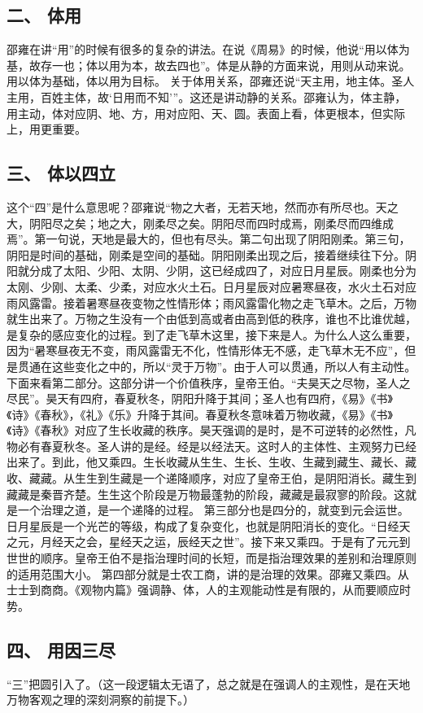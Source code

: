 \documentclass{article}
\begin{document}
\subsection{二、	体用}
邵雍在讲“用”的时候有很多的复杂的讲法。在说《周易》的时候，他说“用以体为基，故存一也；体以用为本，故去四也”。体是从静的方面来说，用则从动来说。用以体为基础，体以用为目标。
关于体用关系，邵雍还说“天主用，地主体。圣人主用，百姓主体，故‘日用而不知’”。这还是讲动静的关系。邵雍认为，体主静，用主动，体对应阴、地、方，用对应阳、天、圆。表面上看，体更根本，但实际上，用更重要。
\subsection{三、	体以四立}
这个“四”是什么意思呢？邵雍说“物之大者，无若天地，然而亦有所尽也。天之大，阴阳尽之矣；地之大，刚柔尽之矣。阴阳尽而四时成焉，刚柔尽而四维成焉”。第一句说，天地是最大的，但也有尽头。第二句出现了阴阳刚柔。第三句，阴阳是时间的基础，刚柔是空间的基础。阴阳刚柔出现之后，接着继续往下分。阴阳就分成了太阳、少阳、太阴、少阴，这已经成四了，对应日月星辰。刚柔也分为太刚、少刚、太柔、少柔，对应水火土石。日月星辰对应暑寒昼夜，水火土石对应雨风露雷。接着暑寒昼夜变物之性情形体；雨风露雷化物之走飞草木。之后，万物就生出来了。万物之生没有一个由低到高或者由高到低的秩序，谁也不比谁优越，是复杂的感应变化的过程。到了走飞草木这里，接下来是人。为什么人这么重要，因为“暑寒昼夜无不变，雨风露雷无不化，性情形体无不感，走飞草木无不应”，但是贯通在这些变化之中的，所以“灵于万物”。由于人可以贯通，所以人有主动性。
下面来看第二部分。这部分讲一个价值秩序，皇帝王伯。“夫昊天之尽物，圣人之尽民”。昊天有四府，春夏秋冬，阴阳升降于其间；圣人也有四府，《易》《书》《诗》《春秋》，《礼》《乐》升降于其间。春夏秋冬意味着万物收藏，《易》《书》《诗》《春秋》对应了生长收藏的秩序。昊天强调的是时，是不可逆转的必然性，凡物必有春夏秋冬。圣人讲的是经。经是以经法天。这时人的主体性、主观努力已经出来了。到此，他又乘四。生长收藏从生生、生长、生收、生藏到藏生、藏长、藏收、藏藏。从生生到生藏是一个递降顺序，对应了皇帝王伯，是阴阳消长。藏生到藏藏是秦晋齐楚。生生这个阶段是万物最蓬勃的阶段，藏藏是最寂寥的阶段。这就是一个治理之道，是一个递降的过程。
第三部分也是四分的，就变到元会运世。日月星辰是一个光芒的等级，构成了复杂变化，也就是阴阳消长的变化。“日经天之元，月经天之会，星经天之运，辰经天之世”。接下来又乘四。于是有了元元到世世的顺序。皇帝王伯不是指治理时间的长短，而是指治理效果的差别和治理原则的适用范围大小。
第四部分就是士农工商，讲的是治理的效果。邵雍又乘四。从士士到商商。《观物内篇》强调静、体，人的主观能动性是有限的，从而要顺应时势。
\subsection{四、	用因三尽}
“三”把圆引入了。（这一段逻辑太无语了，总之就是在强调人的主观性，是在天地万物客观之理的深刻洞察的前提下。）
\end{document}
